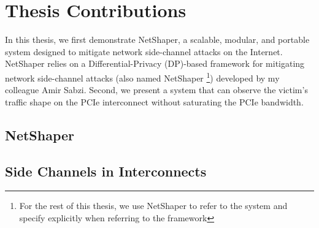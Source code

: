 \section{Thesis Contributions}\label{sec:contributions}

In this thesis, we first demonstrate NetShaper, a scalable, modular, and portable system designed to mitigate network side-channel attacks on the Internet. 
NetShaper relies on a Differential-Privacy (DP)-based framework for mitigating network side-channel attacks 
(also named NetShaper \footnote{For the rest of this thesis, we use NetShaper to refer to the system and specify explicitly when referring to the framework}) 
developed by my colleague Amir Sabzi.
Second, we present a system that can observe the victim's traffic shape on the PCIe interconnect without saturating the PCIe bandwidth.

\subsection{NetShaper}\label{sec:netshaper}
\subsection{Side Channels in Interconnects}\label{sec:interconnect-sc-intro}